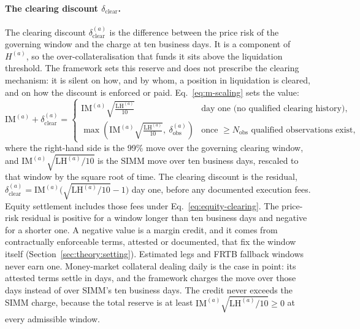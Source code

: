 \paragraph{The clearing discount $\delta_{\mathrm{clear}}$.} The clearing discount $\delta_{\mathrm{clear}}^{(a)}$ is the difference between the price risk of the governing window and the charge at ten business days. It is a component of $H^{(a)}$, so the over-collateralisation that funds it sits above the liquidation threshold. The framework sets this reserve and does not prescribe the clearing mechanism: it is silent on how, and by whom, a position in liquidation is cleared, and on how the discount is enforced or paid. Eq.~\eqref{eq:m-scaling} sets the value:
\begin{equation}\label{eq:m-scaling}
\mathrm{IM}^{(a)} + \delta_{\mathrm{clear}}^{(a)} =
\begin{cases}
\mathrm{IM}^{(a)}\sqrt{\tfrac{\mathrm{LH}^{(a)}}{10}} & \text{day one (no qualified clearing history),}\\[4pt]
\max\!\left(\mathrm{IM}^{(a)}\sqrt{\tfrac{\mathrm{LH}^{(a)}}{10}},\ \delta_{\mathrm{obs}}^{(a)}\right) & \text{once } \ge N_{\mathrm{obs}} \text{ qualified observations exist,}
\end{cases}
\end{equation}
where the right-hand side is the 99\% move over the governing clearing window, and $\mathrm{IM}^{(a)}\sqrt{\mathrm{LH}^{(a)}/10}$ is the SIMM move over ten business days, rescaled to that window by the square root of time. The clearing discount is the residual, $\delta_{\mathrm{clear}}^{(a)}=\mathrm{IM}^{(a)}\bigl(\sqrt{\mathrm{LH}^{(a)}/10}-1\bigr)$ day one, before any documented execution fees. Equity settlement includes those fees under Eq.~\eqref{eq:equity-clearing}. The price-risk residual is positive for a window longer than ten business days and negative for a shorter one. A negative value is a margin credit, and it comes from contractually enforceable terms, attested or documented, that fix the window itself (Section~\ref{sec:theory:setting}). Estimated legs and FRTB fallback windows never earn one. Money-market collateral dealing daily is the case in point: its attested terms settle in days, and the framework charges the move over those days instead of over SIMM's ten business days. The credit never exceeds the SIMM charge, because the total reserve is at least $\mathrm{IM}^{(a)}\sqrt{\mathrm{LH}^{(a)}/10}\ge 0$ at every admissible window.

